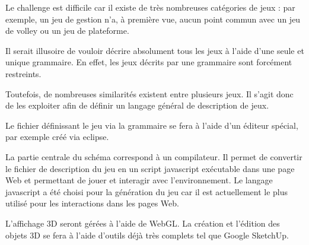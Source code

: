 Le challenge est difficile car il existe de très nombreuses catégories de jeux : 
par exemple, un jeu de gestion n'a, à première vue, aucun point commun avec un jeu de volley ou un jeu de plateforme.

Il serait illusoire de vouloir décrire absolument tous les jeux à l'aide d'une seule et unique grammaire.
En effet, les jeux décrits par une grammaire sont forcément restreints.

Toutefois, de nombreuses similarités existent entre plusieurs jeux. Il s'agit donc de les exploiter afin de définir un langage général de description de jeux.

Le fichier définissant le jeu via la grammaire se fera à l'aide d'un éditeur spécial, par exemple créé via eclipse.

\vspace{0.5cm}

La partie centrale du schéma correspond à un compilateur.
Il permet de convertir le fichier de description du jeu en un script javascript exécutable dans une page Web et permettant de jouer et 
interagir avec l'environnement.
Le langage javascript a été choisi pour la génération du jeu car il est actuellement le plus utilisé pour les interactions dans les pages Web.

L'affichage 3D seront gérées à l'aide de WebGL.
La création et l'édition des objets 3D se fera à l'aide d'outils déjà très complets tel que Google SketchUp.
